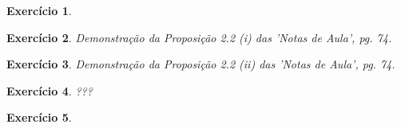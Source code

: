 \documentclass[letter,11pt]{article}
\newtheorem{exer}{Exercício}
\newcommand{\mat}[1]{\mbox{\boldmath{$#1$}}}
\begin{document}
\begin{exer} \rm
\end{exer}


\begin{exer} \rm
Demonstração da Proposição 2.2 (i) das 'Notas de Aula', pg. 74.
\end{exer}


\begin{exer} \rm
Demonstração da Proposição 2.2 (ii) das 'Notas de Aula', pg. 74.
\end{exer}

\begin{exer} \rm
???
\end{exer}

\begin{exer} \rm
\end{exer}
\end{document}
